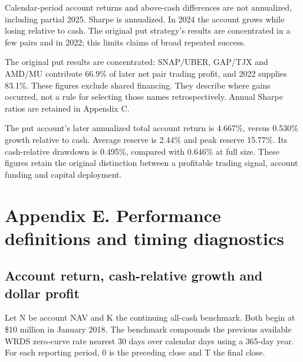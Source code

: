 \documentclass[11pt,letterpaper]{article}
\begin{document}
\begin{center}\small{}\end{center}
Calendar-period account returns and above-cash differences are not annualized, including partial 2025. Sharpe is annualized. In 2024 the account grows while losing relative to cash. The original put strategy's results are concentrated in a few pairs and in 2022; this limits claims of broad repeated success.

The original put results are concentrated: SNAP/UBER, GAP/TJX and AMD/MU contribute 66.9\% of later net pair trading profit, and 2022 supplies 83.1\%. These figures exclude shared financing. They describe where gains occurred, not a rule for selecting those names retrospectively. Annual Sharpe ratios are retained in Appendix C.

The put account's later annualized total account return is 4.667\%, versus 0.530\% growth relative to cash. Average reserve is 2.44\% and peak reserve 15.77\%. Its cash-relative drawdown is 0.495\%, compared with 0.646\% at full size. These figures retain the original distinction between a profitable trading signal, account funding and capital deployment.

\clearpage
\section*{Appendix E. Performance definitions and timing diagnostics}
\subsection*{Account return, cash-relative growth and dollar profit}
Let N be account NAV and K the continuing all-cash benchmark. Both begin at \$10 million in January 2018. The benchmark compounds the previous available WRDS zero-curve rate nearest 30 days over calendar days using a 365-day year. For each reporting period, 0 is the preceding close and T the final close.
\end{document}
